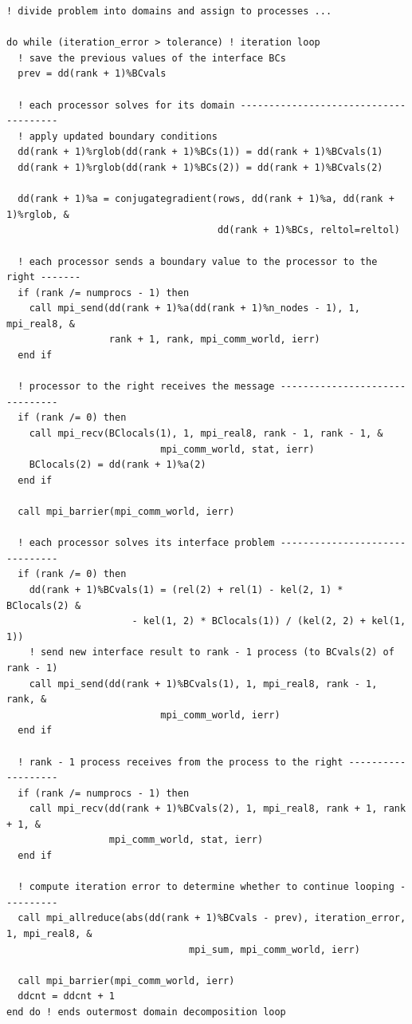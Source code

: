 \documentclass[10pt]{article}
\begin{document}
\begin{lstlisting}
! divide problem into domains and assign to processes ...

do while (iteration_error > tolerance) ! iteration loop 
  ! save the previous values of the interface BCs
  prev = dd(rank + 1)%BCvals

  ! each processor solves for its domain --------------------------------------
  ! apply updated boundary conditions
  dd(rank + 1)%rglob(dd(rank + 1)%BCs(1)) = dd(rank + 1)%BCvals(1)
  dd(rank + 1)%rglob(dd(rank + 1)%BCs(2)) = dd(rank + 1)%BCvals(2)

  dd(rank + 1)%a = conjugategradient(rows, dd(rank + 1)%a, dd(rank + 1)%rglob, &
                                     dd(rank + 1)%BCs, reltol=reltol)

  ! each processor sends a boundary value to the processor to the right -------
  if (rank /= numprocs - 1) then
    call mpi_send(dd(rank + 1)%a(dd(rank + 1)%n_nodes - 1), 1, mpi_real8, &
                  rank + 1, rank, mpi_comm_world, ierr)
  end if

  ! processor to the right receives the message -------------------------------
  if (rank /= 0) then
    call mpi_recv(BClocals(1), 1, mpi_real8, rank - 1, rank - 1, &
                           mpi_comm_world, stat, ierr)
    BClocals(2) = dd(rank + 1)%a(2)
  end if

  call mpi_barrier(mpi_comm_world, ierr)

  ! each processor solves its interface problem -------------------------------
  if (rank /= 0) then
    dd(rank + 1)%BCvals(1) = (rel(2) + rel(1) - kel(2, 1) * BClocals(2) &
                      - kel(1, 2) * BClocals(1)) / (kel(2, 2) + kel(1, 1))
    ! send new interface result to rank - 1 process (to BCvals(2) of rank - 1)
    call mpi_send(dd(rank + 1)%BCvals(1), 1, mpi_real8, rank - 1, rank, &
                           mpi_comm_world, ierr)
  end if

  ! rank - 1 process receives from the process to the right -------------------
  if (rank /= numprocs - 1) then
    call mpi_recv(dd(rank + 1)%BCvals(2), 1, mpi_real8, rank + 1, rank + 1, &
                  mpi_comm_world, stat, ierr)
  end if

  ! compute iteration error to determine whether to continue looping ----------
  call mpi_allreduce(abs(dd(rank + 1)%BCvals - prev), iteration_error, 1, mpi_real8, &
                                mpi_sum, mpi_comm_world, ierr)

  call mpi_barrier(mpi_comm_world, ierr)
  ddcnt = ddcnt + 1
end do ! ends outermost domain decomposition loop
\end{lstlisting}
\end{document}
